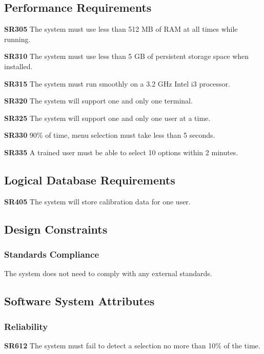 \documentclass{article}
\begin{document}
\subsection{Performance Requirements}

\textbf{SR305} The system must use less than 512 MB of RAM at all times while running.

\textbf{SR310} The system must use less than 5 GB of persistent storage space when installed.

\textbf{SR315} The system must run smoothly on a 3.2 GHz Intel i3 processor.

\textbf{SR320} The system will support one and only one terminal.

\textbf{SR325} The system will support one and only one user at a time.

\textbf{SR330} 90\% of time, menu selection must take less than 5 seconds.

\textbf{SR335} A trained user must be able to select 10 options within 2
minutes.

\subsection{Logical Database Requirements}

\textbf{SR405} The system will store calibration data for one user.

\subsection{Design Constraints}

\subsubsection{Standards Compliance}

The system does not need to comply with any external standards.

\subsection{Software System Attributes}

\subsubsection{Reliability} 

\textbf{SR612} The system must fail to detect a selection no more than 10\% of
the time.
\end{document}
